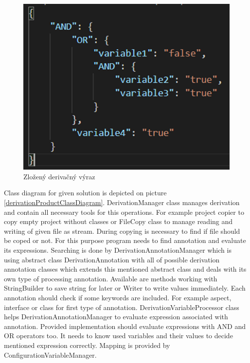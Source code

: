 \documentclass[11pt,slovak,a4paper,twoside]{article}
\begin{document}
\begin{figure}[t]  %
					\begin{center}
									\includegraphics[width=\linewidth]{fig/expresion.png}
									\caption{Zložený derivačný výraz}
									\label{complexDerivationRule}
					\end{center}
\end{figure}

Class diagram for given solution is depicted on picture \ref{derivationProductClassDiagram}. DerivationManager class manages derivation and contain all necessary tools for this operations. For example project copier to copy empty project without classes or FileCopy class to manage reading and writing of given file as stream. During copying is necessary to find if file should be coped or not. For this purpose program needs to find annotation and evaluate its expressions. Searching is done by DerivationAnnotationManager which is using abstract class DerivationAnnotation with all of possible derivation annotation classes which extends this mentioned abstract class and deals with its own type of processing annotation. Available are methods working with StringBuilder to save string for later or Writer to write values immediately. Each annotation should check if some keywords are included. For example aspect, interface or class for first type of annotation. DerivationVariableProcessor class helps DerivationAnnotationManager to evaluate expression associated with annotation. Provided implementation should evaluate expressions with AND and OR operators too. It needs to know used variables and their values to decide mentioned expression correctly. Mapping is provided by ConfigurationVariableManager.
\end{document}
